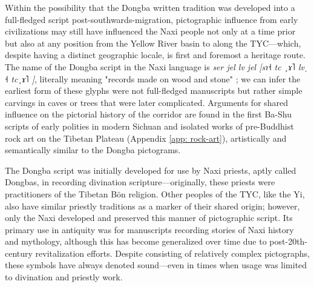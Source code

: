 \documentclass[11pt,a4paper,oneside]{report}
\begin{document}
Within the possibility that the Dongba written tradition was developed into a full-fledged script post-southwards-migration, pictographic influence from early civilizations may still have influenced the Naxi people not only at a time prior but also at any position from the Yellow River basin to along the TYC—which, despite having a distinct geographic locale, is first and foremost a heritage route. The name of the Dongba script in the Naxi language is \textit{ser jel lv jel [sɿ˧ tc ¸ɤ˥ lv ̩ ˧ tc¸ɤ˥ ]}, literally meaning "records made on wood and stone" \cite{poupard_writings_2021}; we can infer the earliest form of these glyphs were not full-fledged manuscripts but rather simple carvings in caves or trees that were later complicated. Arguments for shared influence on the pictorial history of the corridor are found in the first Ba-Shu scripts of early polities in modern Sichuan and isolated works of pre-Buddhist rock art on the Tibetan Plateau (Appendix \ref{app: rock-art}), artistically and semantically similar to the Dongba pictograms. 

The Dongba script was initially developed for use by Naxi priests, aptly called Dongbas, in recording divination scripture—originally, these priests were practitioners of the Tibetan Bön religion. Other peoples of the TYC, like the Yi, also have similar priestly traditions as a marker of their shared origin; however, only the Naxi developed and preserved this manner of pictographic script. Its primary use in antiquity was for manuscripts recording stories of Naxi history and mythology, although this has become generalized over time due to post-20th-century revitalization efforts. Despite consisting of relatively complex pictographs, these symbols have always denoted sound—even in times when usage was limited to divination and priestly work.
\end{document}
